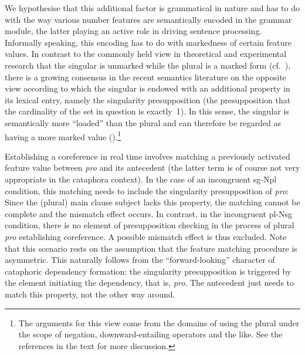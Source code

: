 \documentclass[output=paper,colorlinks,citecolor=brown]{langscibook}
\begin{document}
We hypothesise that this additional factor is grammatical in nature and has to do with the way various number features are semantically encoded in the grammar module, the latter playing an active role in driving sentence processing. Informally speaking, this encoding has to do with markedness of certain feature values. In contrast to the commonly held view in theoretical and experimental research that the singular is unmarked while the plural is a marked form (cf.\ \citealt{bock1993}), there is a growing consensus in the recent semantics literature on the opposite view according to which the singular is endowed with an additional property in its lexical entry, namely the singularity presupposition (the presupposition that the cardinality of the set in question is exactly~1). In this sense, the singular is semantically more ``loaded'' than the plural and can therefore be regarded as having a more marked value (\citealt{sauerland2003, sauerland.etal2005, spector2007}).\footnote{The arguments for this view come from the domains of using the plural under the scope of negation, downward-entailing operators and the like. See the references in the text for more discussion.}

Establishing a coreference in real time involves matching a previously activated feature value between \textit{pro} and its antecedent (the latter term is of course not very appropriate in the cataphora context). In the case of an incongruent sg-Npl condition, this matching needs to include the singularity presupposition of \textit{pro}: Since the (plural) main clause subject lacks this property, the matching cannot be complete and the mismatch effect occurs. In contrast, in the incongruent pl-Nsg condition, there is no element of presupposition checking in the process of plural \textit{pro} establishing coreference. A possible mismatch effect is thus excluded. Note that this scenario rests on the assumption that the feature matching procedure is asymmetric. This naturally follows from the ``forward-looking'' character of cataphoric dependency formation: the singularity presupposition is triggered by the element initiating the dependency, that is, \textit{pro}. The antecedent just needs to match this property, not the other way around. 
\end{document}

